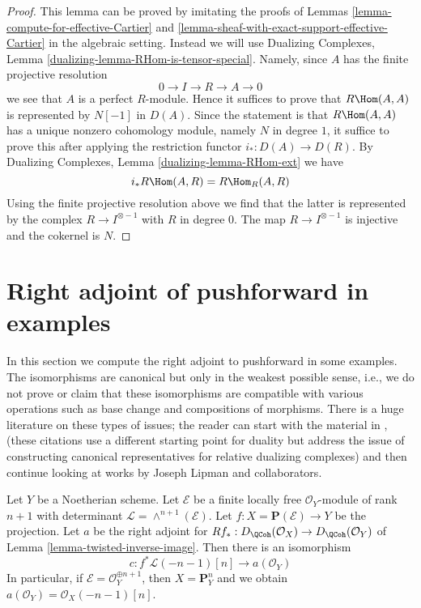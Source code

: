 \begin{proof}
This lemma can be proved by imitating the proofs of
Lemmas \ref{lemma-compute-for-effective-Cartier} and
\ref{lemma-sheaf-with-exact-support-effective-Cartier}
in the algebraic setting. Instead we will use
Dualizing Complexes, Lemma \ref{dualizing-lemma-RHom-is-tensor-special}.
Namely, since $A$ has the finite projective resolution
$$
0 \to I \to R \to A \to 0
$$
we see that $A$ is a perfect $R$-module. Hence it suffices
to prove that $R\Hom(A, A)$ is represented by $N[-1]$ in $D(A)$.
Since the statement is that $R\Hom(A, A)$ has a unique nonzero
cohomology module, namely $N$ in degree $1$, it suffice to prove
this after applying the restriction functor $i_* : D(A) \to D(R)$.
By Dualizing Complexes, Lemma \ref{dualizing-lemma-RHom-ext}
we have
$$
i_*R\Hom(A, R) = R\Hom_R(A, R)
$$
Using the finite projective resolution above we find that the latter
is represented by the complex $R \to I^{\otimes -1}$ with $R$
in degree $0$. The map $R \to I^{\otimes -1}$ is injective
and the cokernel is $N$.
\end{proof}





\section{Right adjoint of pushforward in examples}
\label{section-examples}

\noindent
In this section we compute the right adjoint to pushforward in
some examples. The isomorphisms are canonical but only in the weakest
possible sense, i.e., we do not prove or claim that these isomorphisms are
compatible with various operations such as base change and compositions
of morphisms. There is a huge literature on these types of issues; the reader
can start with the material in \cite{RD}, \cite{Conrad-GD}
(these citations use a different starting point for duality but address the
issue of constructing canonical representatives for relative dualizing
complexes) and then continue looking at works by
Joseph Lipman and collaborators.

\begin{lemma}
\label{lemma-upper-shriek-P1}
Let $Y$ be a Noetherian scheme. Let $\mathcal{E}$ be a finite locally
free $\mathcal{O}_Y$-module of rank $n + 1$ with determinant
$\mathcal{L} = \wedge^{n + 1}(\mathcal{E})$.
Let $f : X = \mathbf{P}(\mathcal{E}) \to Y$ be the projection.
Let $a$ be the right adjoint for
$Rf_* : D_\QCoh(\mathcal{O}_X) \to D_\QCoh(\mathcal{O}_Y)$ of
Lemma \ref{lemma-twisted-inverse-image}.
Then there is an isomorphism
$$
c : f^*\mathcal{L}(-n - 1)[n] \longrightarrow a(\mathcal{O}_Y)
$$
In particular, if $\mathcal{E} = \mathcal{O}_Y^{\oplus n + 1}$, then
$X = \mathbf{P}^n_Y$ and we obtain
$a(\mathcal{O}_Y) = \mathcal{O}_X(-n - 1)[n]$.
\end{lemma}

